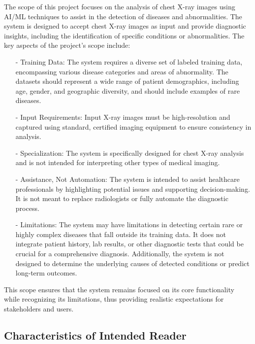 \documentclass[12pt]{article}
\begin{document}
The scope of this project focuses on the analysis of chest X-ray images using AI/ML techniques to assist in the detection of diseases and abnormalities. The system is designed to accept chest X-ray images as input and provide diagnostic insights, including the identification of specific conditions or abnormalities. The key aspects of the project's scope include:

\begin{itemize}
    \item[-] Training Data: The system requires a diverse set of labeled training data, encompassing various disease categories and areas of abnormality. The datasets should represent a wide range of patient demographics, including age, gender, and geographic diversity, and should include examples of rare diseases.
    \item[-] Input Requirements: Input X-ray images must be high-resolution and captured using standard, certified imaging equipment to ensure consistency in analysis.
    \item[-] Specialization: The system is specifically designed for chest X-ray analysis and is not intended for interpreting other types of medical imaging.
    \item[-] Assistance, Not Automation: The system is intended to assist healthcare professionals by highlighting potential issues and supporting decision-making. It is not meant to replace radiologists or fully automate the diagnostic process.
    \item[-] Limitations: The system may have limitations in detecting certain rare or highly complex diseases that fall outside its training data. It does not integrate patient history, lab results, or other diagnostic tests that could be crucial for a comprehensive diagnosis. Additionally, the system is not designed to determine the underlying causes of detected conditions or predict long-term outcomes.
\end{itemize}

\noindent This scope ensures that the system remains focused on its core functionality while recognizing its limitations, thus providing realistic expectations for stakeholders and users.

\subsection{Characteristics of Intended Reader} \label{sec_IntendedReader}
\end{document}
